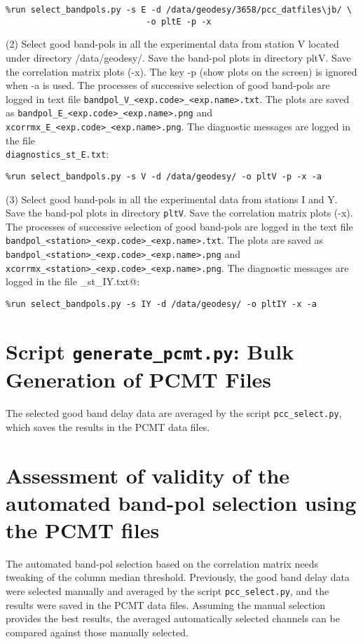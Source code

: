 \documentclass[preprint]{aastex}
\begin{document}
\verb$%run select_bandpols.py -s E -d /data/geodesy/3658/pcc_datfiles\jb/ \$ \\
\verb$                            -o pltE -p -x$

(2) Select good band-pols in all the experimental data from station V
located under directory /data/geodesy/. 
Save the band-pol plots in directory pltV. Save the correlation matrix plots
(-x). The key -p (show plots on the screen) is ignored when -a is used.  
The processes of successive selection of good band-pols are
logged in text file \verb$bandpol_V_<exp.code>_<exp.name>.txt$. 
The plots are saved as \verb$bandpol_E_<exp.code>_<exp.name>.png$ and \\
\verb$xcorrmx_E_<exp.code>_<exp.name>.png$.
The diagnostic messages are logged in the file\\
\verb$diagnostics_st_E.txt$:

\verb$%run select_bandpols.py -s V -d /data/geodesy/ -o pltV -p -x -a$

(3) Select good band-pols in all the experimental data from stations
I and Y. Save the band-pol plots in directory \verb$pltV$. Save the correlation matrix
plots (-x).  
The processes of successive selection of good band-pols are logged in the text file \verb$bandpol_<station>_<exp.code>_<exp.name>.txt$. The plots are saved as \verb$bandpol_<station>_<exp.code>_<exp.name>.png$ and \\
\verb$xcorrmx_<station>_<exp.code>_<exp.name>.png$.
The diagnostic messages are logged in the file \verb@diagnostics_st_IY.txt@:

\verb$%run select_bandpols.py -s IY -d /data/geodesy/ -o pltIY -x -a$



\section{Script \texttt{generate\_pcmt.py}: Bulk Generation of PCMT Files}

The selected good band delay data are averaged by the script \verb$pcc_select.py$, which saves the results in the PCMT data files. 



\section{Assessment of validity of the automated band-pol selection using the PCMT files}

The automated band-pol selection based on the correlation matrix needs tweaking of the column median threshold. Previously, the good band delay data were selected manually and averaged by the script \verb$pcc_select.py$, and the results were saved in the PCMT data files. Assuming the manual selection provides the best results, the averaged automatically selected channels can be compared against those manually selected. 
\end{document}
